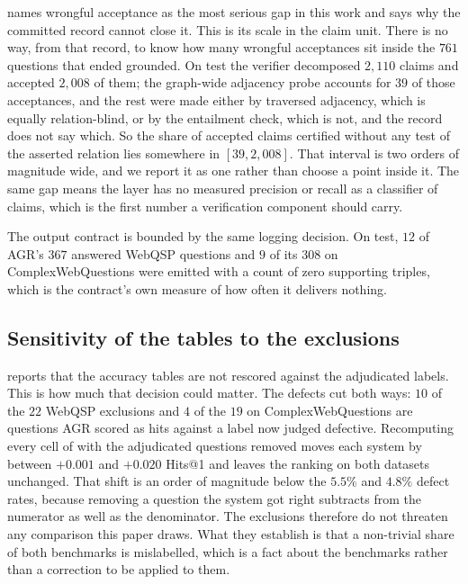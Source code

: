  names wrongful acceptance as the most
serious gap in this work and says why the committed record cannot close
it. This is its scale in the claim unit. There is no way, from that
record, to know how many wrongful acceptances sit inside the $761$
questions that ended grounded. On test the verifier decomposed $2{,}110$
claims and accepted $2{,}008$ of them; the graph-wide adjacency probe
accounts for $39$ of those acceptances, and the rest were made either by
traversed adjacency, which is equally relation-blind, or by the
entailment check, which is not, and the record does not say which. So
the share of accepted claims certified without any test of the asserted
relation lies somewhere in $[39, 2{,}008]$. That interval is two orders
of magnitude wide, and we report it as one rather than choose a point
inside it. The same gap means the layer has no measured precision or
recall as a classifier of claims, which is the first number a
verification component should carry.

The output contract is bounded by the same logging decision. On test,
$12$ of AGR's $367$ answered WebQSP questions and $9$ of its $308$ on
ComplexWebQuestions were emitted with a count of zero supporting
triples, which is the contract's own measure of how often it delivers
nothing.

\subsection{Sensitivity of the tables to the
  exclusions}\label{app:sensitivity}

 reports that the accuracy tables are not rescored
against the adjudicated labels. This is how much that decision could
matter. The defects cut both ways: $10$ of the $22$ WebQSP exclusions
and $4$ of the $19$ on ComplexWebQuestions are questions AGR scored as
hits against a label now judged defective. Recomputing every cell of
 with the adjudicated questions removed moves each system
by between $+0.001$ and $+0.020$ Hits@1 and leaves the ranking on both
datasets unchanged. That shift is an order of magnitude below the
$5.5\%$ and $4.8\%$ defect rates, because removing a question the system
got right subtracts from the numerator as well as the denominator. The
exclusions therefore do not threaten any comparison this paper draws.
What they establish is that a non-trivial share of both benchmarks is
mislabelled, which is a fact about the benchmarks rather than a
correction to be applied to them.
